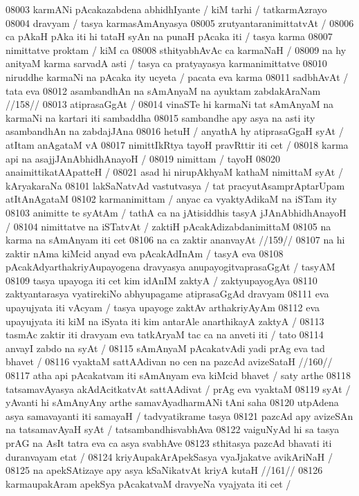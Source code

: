 08003 karmANi pAcakazabdena abhidhIyante / kiM tarhi / tatkarmAzrayo 
08004 dravyam / tasya karmasAmAnyasya 
08005 	zrutyantaranimittatvAt /  
08006 ca pAkaH pAka iti hi tataH syAn na punaH pAcaka iti / tasya karma 
08007 nimittatve proktam / kiM ca  
08008 	sthityabhAvAc ca karmaNaH /
08009 na hy anityaM karma sarvadA asti / tasya ca pratyayasya karmanimittatve 
08010 niruddhe karmaNi na pAcaka ity ucyeta / pacata eva karma 
08011 sadbhAvAt / tata eva 
08012 	asambandhAn na sAmAnyaM na ayuktam zabdakAraNam //158//
08013 	atiprasaGgAt /  
08014 vinaSTe hi karmaNi tat sAmAnyaM na karmaNi na kartari iti sambaddha 
08015 sambandhe apy asya na asti ity asambandhAn na zabdajJAna  
08016 hetuH / anyathA hy atiprasaGgaH syAt / atItam anAgataM vA
08017 nimittIkRtya tayoH pravRttir iti cet /  
08018 	karma api na asajjJAnAbhidhAnayoH /  
08019 nimittam / tayoH 
08020 	anaimittikatAApatteH / 
08021 asad hi nirupAkhyaM kathaM nimittaM syAt / kAryakaraNa
08101 lakSaNatvAd  vastutvasya / tat pracyutAsamprAptarUpam atItAnAgataM
08102 karmanimittam / anyac ca vyaktyAdikaM na iSTam ity
08103 animitte te syAtAm / tathA ca na jAtisiddhis tasyA jJAnAbhidhAnayoH /
08104 nimittatve na iSTatvAt / zaktiH pAcakAdizabdanimittaM  
08105 na karma na sAmAnyam iti cet  
08106 	na ca zaktir ananvayAt //159//  
08107 na hi zaktir nAma kiMcid anyad eva pAcakAdInAm / tasyA eva  
08108 pAcakAdyarthakriyAupayogena dravyasya anupayogitvaprasaGgAt / tasyAM
08109 tasya upayoga iti cet kim idAnIM zaktyA / zaktyupayogAya 
08110 zaktyantarasya vyatirekiNo abhyupagame atiprasaGgAd dravyam 
08111 eva upayujyata iti vAcyam / tasya upayoge zaktAv arthakriyAyAm  
08112 eva upayujyata iti kiM na iSyata iti kim antarAle anarthikayA zaktyA / 
08113 tasmAc zaktir iti dravyam eva tatkAryaM tac ca na anveti iti / tato 
08114 anvayI zabdo na syAt /  
08115 	sAmAnyaM pAcakatvAdi yadi prAg eva tad bhavet /
08116 	vyaktaM sattAAdivan no cen na pazcAd avizeSataH //160//
08117 atha api pAcakatvam iti sAmAnyam eva kiMcid bhavet / saty arthe  
08118 tatsamavAyasya akAdAcitkatvAt sattAAdivat / prAg eva vyaktaM 
08119 syAt / yAvanti hi sAmAnyAny arthe samavAyadharmANi tAni saha  
08120 utpAdena asya samavayanti iti samayaH / tadvyatikrame tasya 
08121 pazcAd apy avizeSAn na tatsamavAyaH syAt / tatsambandhisvabhAva  
08122 vaiguNyAd hi sa tasya prAG na AsIt tatra eva ca asya svabhAve  
08123 sthitasya pazcAd bhavati iti duranvayam etat /
08124 	kriyAupakArApekSasya vyaJjakatve avikAriNaH /
08125 	na apekSAtizaye apy asya kSaNikatvAt kriyA kutaH //161//
08126 karmaupakAram apekSya pAcakatvaM dravyeNa vyajyata iti cet /  

